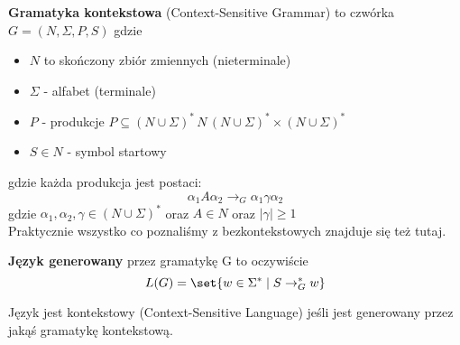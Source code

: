 \begin{definition}
	\textbf{Gramatyka kontekstowa} (Context-Sensitive Grammar) to czwórka \( G = (N, \Sigma, P, S) \) gdzie
	\begin{itemize}
		\item \( N \) to skończony zbiór zmiennych (nieterminale)
		\item \( \Sigma \) - alfabet (terminale)
		\item \( P \) - produkcje \( P \subseteq
		      (N \cup \Sigma)^* \, N \,
		      (N \cup \Sigma)^* \times
		      (N \cup \Sigma)^* \)
		\item \( S \in N \) - symbol startowy
	\end{itemize}
\end{definition}
gdzie każda produkcja jest postaci:
\[
	\alpha_1 A \alpha_2 \rightarrow_G \alpha_1 \gamma \alpha_2
\]
gdzie \( \alpha_1, \alpha_2, \gamma \in (N \cup \Sigma)^* \) oraz \( A \in N \)
oraz \( |\gamma| \geq 1\) \\
Praktycznie wszystko co poznaliśmy z bezkontekstowych znajduje się też tutaj.

\begin{definition}
	\textbf{Język  generowany} przez gramatykę G to oczywiście
	\[
		L(G) = \set{w \in \Sigma^* \mid S \rightarrow_G^* w}
	\]
\end{definition}

\begin{definition}
	Język jest kontekstowy (Context-Sensitive Language) jeśli jest generowany przez jakąś gramatykę kontekstową.
\end{definition}
